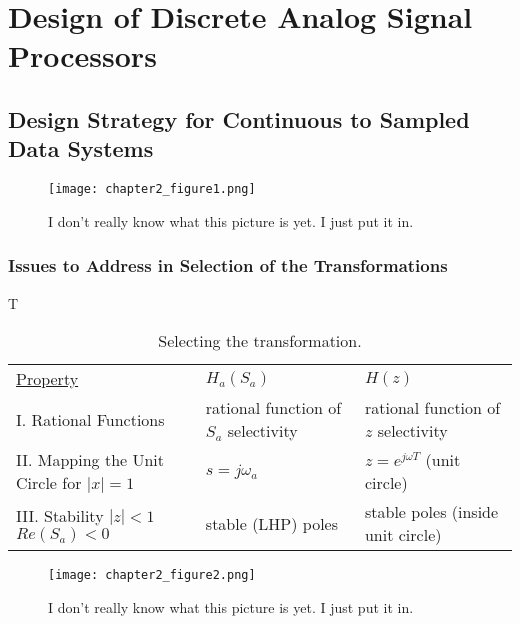 \documentclass[11pt,fleqn]{book} %
\begin{document}


\chapter{Design of Discrete Analog Signal Processors}

\section{Design Strategy for Continuous to Sampled Data Systems}

\begin{figure}[h]
  \centering\texttt{[image: chapter2\_figure1.png]}
  \caption{I don't really know what this picture is yet. I just put it in.}
\end{figure}

\subsection{Issues to Address in Selection of the Transformations}

T\begin{table}[h]
\centering
\begin{tabulary}{1\textwidth}{L|L|L}
  \underline{Property} & \underline{$H_a(S_a)$} & \underline{$H(z)$} \\
  I. Rational Functions & rational function of $S_a$ selectivity & rational
  function of $z$ selectivity \\
  II. Mapping the Unit Circle for $|x| = 1$ & $s = j\omega_a$ &
  $z=e^{j\omega T}$ (unit circle) \\
  III. Stability $|z|<1$ $Re(S_a) < 0$ & stable (LHP) poles & stable
  poles (inside unit circle) \\
\end{tabulary}
\caption{Selecting the transformation.}
\end{table}

\begin{figure}[h]
  \centering\texttt{[image: chapter2\_figure2.png]}
  \caption{I don't really know what this picture is yet. I just put it in.}
\end{figure}
\end{document}
